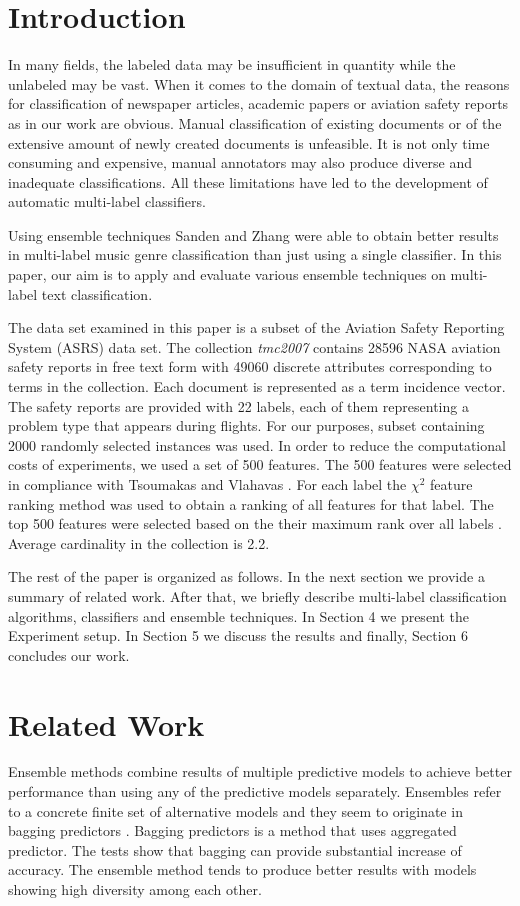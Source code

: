 \section{Introduction}
In many fields, the labeled data may be insufficient in quantity while the unlabeled may be vast. When it comes to the domain of textual data, the reasons for classification of newspaper articles, academic papers or aviation safety reports as in our work are obvious. Manual classification of existing documents or of the extensive amount of newly created documents is unfeasible. It is not only time consuming and expensive, manual annotators may also produce diverse and inadequate classifications. All these limitations have led to the development of automatic multi-label classifiers.

Using ensemble techniques Sanden and Zhang \cite{sanden2011enhancing} were able to obtain better results in multi-label music genre classification than just using a single classifier. In this paper, our aim is to apply and evaluate various ensemble techniques on multi-label text classification.

The data set examined in this paper is a subset of the Aviation Safety Reporting System (ASRS) data set. The collection \emph{tmc2007} contains 28596 NASA aviation safety reports in free text form with 49060 discrete attributes corresponding to terms in the collection. Each document is represented as a term incidence vector. The safety reports are provided with 22 labels, each of them representing a problem type that appears during flights. For our purposes, subset containing 2000 randomly selected instances was used. In order to reduce the computational costs of experiments, we used a set of 500 features. The 500 features were selected in compliance with Tsoumakas and Vlahavas \cite{TsoumakasVlahavas2007kLablesets}. For each label the $\chi^{2}$ feature ranking method was used to obtain a ranking of all features for that label. The top 500 features were selected based on the their maximum rank over all labels \cite{TsoumakasVlahavas2007kLablesets}. Average cardinality in the collection is 2.2.

The rest of the paper is organized as follows. In the next section we provide a summary of related work. After that, we briefly describe multi-label classification algorithms, classifiers and ensemble techniques. In Section 4 we present the Experiment setup. In Section 5 we discuss the results and finally, Section 6 concludes our work.

\section{Related Work}
Ensemble methods combine results of multiple predictive models to achieve better performance than using any of the predictive models separately. Ensembles refer to a concrete finite set of alternative models and they seem to originate in bagging predictors \cite{breiman1996bagging}. Bagging predictors is a method that uses aggregated predictor. The tests show that bagging can provide substantial increase of accuracy. The ensemble method tends to produce better results with models showing high diversity among each other. 


